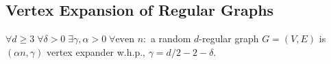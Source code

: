 %    
%    
%    
%
%    
%    
%    
%    
%    
%    
%    
%    
%    
%    
%    
%    

\subsection{Vertex Expansion of Regular Graphs}
\label{subsec:vertex-expansion-reg}

\begin{theorem}
    \label{thm:reg-vertex-expansion}
    $\forall d\geq3\;\forall\delta>0\;\exists\gamma,\alpha>0\;\forall\text{even }n:$ a random $d$-regular graph $G=(V,E)$
    is $(\alpha n,\gamma)$ vertex expander w.h.p., $\gamma=d/2-2-\delta$.
\end{theorem}

